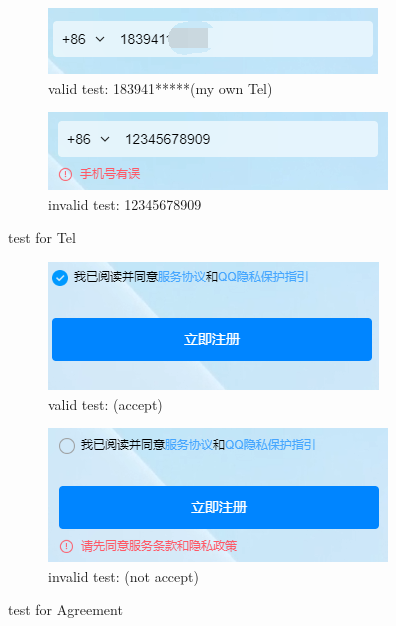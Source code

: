 \documentclass[11pt, oneside]{article}  %
\begin{document}
\begin{figure}[H]
    \centering
	\begin{subfigure}{0.4\linewidth}
		\includegraphics[width=1\linewidth]{./pic/3.3.9.png}
        \caption{valid test: 183941*****(my own Tel)}
	\end{subfigure}
    \begin{subfigure}{0.4\linewidth}
		\includegraphics[width=1\linewidth]{./pic/3.3.6.png}
        \caption{invalid test: 12345678909}
	\end{subfigure}
    \caption{test for Tel}
\end{figure}

\begin{figure}[H]
    \centering
	\begin{subfigure}{0.4\linewidth}
		\includegraphics[width=1\linewidth]{./pic/3.4.2.png}
        \caption{valid test: (accept)}
	\end{subfigure}
    \begin{subfigure}{0.4\linewidth}
		\includegraphics[width=1\linewidth]{./pic/3.4.1.png}
        \caption{invalid test: (not accept)}
	\end{subfigure}
    \caption{test for Agreement}
\end{figure}
\end{document}
